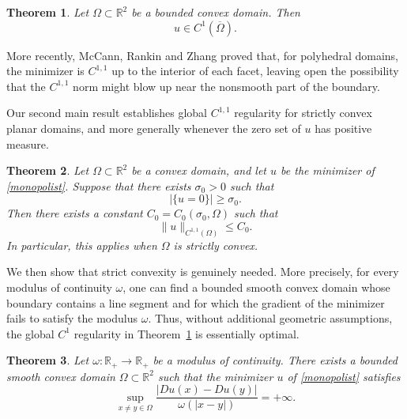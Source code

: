 \documentclass[reqno,11pt]{amsart}
\newtheorem{thm}{Theorem}[section]
\numberwithin{equation}{section}
\theoremstyle{remark}
\begin{document}
\begin{thm}\label{thm:C1}
Let $\Omega\subset\mathbb R^2$ be a bounded convex domain.
Then
\[
u\in C^1(\overline\Omega).
\]
\end{thm}

More recently,  McCann, Rankin and Zhang \cite{MRZ20252} proved that, for polyhedral domains,
the minimizer is $C^{1,1}$ up to the interior of each facet, leaving open the possibility that the
$C^{1,1}$ norm might blow up near the nonsmooth part of the boundary.


Our second main result establishes global $C^{1,1}$ regularity for strictly convex planar domains, and more generally whenever the zero set of $u$ has positive measure.

\begin{thm}\label{C11est}
Let $\Omega \subset \mathbb{R}^2$ be a convex domain, and let $u$ be the minimizer of \eqref{monopolist}. Suppose that there exists $\sigma_0>0$ such that
\[
|\{u=0\}|\ge \sigma_0.
\]
Then there exists a constant $C_0=C_0(\sigma_0,\Omega)$ such that
\[
\|u\|_{C^{1,1}(\Omega)}\le C_0.
\]
In particular, this applies when $\Omega$ is strictly convex.
\end{thm}


We then show that strict convexity is genuinely needed. More precisely, for every modulus of continuity
$\omega$, one can find a bounded smooth convex domain whose boundary contains a line segment and for which
the gradient of the minimizer fails to satisfy the modulus $\omega$.
Thus, without additional geometric assumptions, the global $C^1$ regularity in
Theorem~\ref{thm:C1} is essentially optimal.

\begin{thm}\label{C11fails}
Let $\omega:\mathbb{R}_+\to\mathbb{R}_+$ be a modulus of continuity.
There exists a bounded smooth convex domain $\Omega \subset \mathbb{R}^2$ such that the minimizer $u$ of \eqref{monopolist} satisfies
\[
\sup_{x\neq y\in\Omega}
\frac{|Du(x)-Du(y)|}{\omega(|x-y|)}
=+\infty.
\]
\end{thm}
\end{document}
